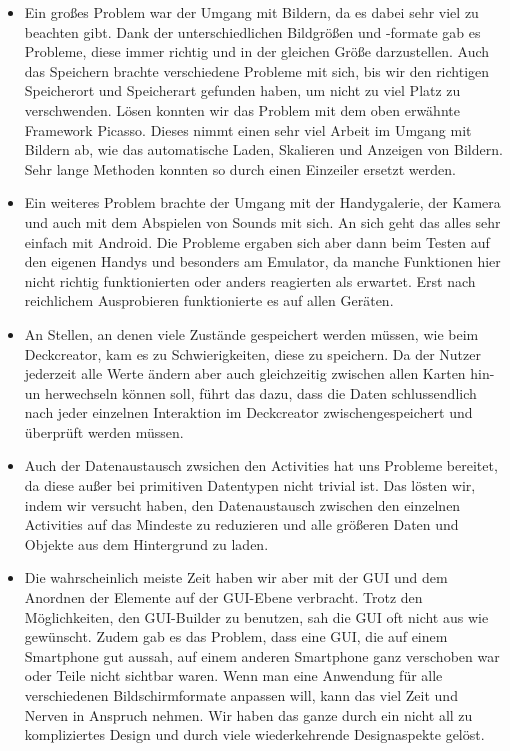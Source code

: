\begin{itemize} 
\item Ein großes Problem war der Umgang mit Bildern, da es dabei sehr viel zu beachten gibt. Dank der unterschiedlichen Bildgrößen und -formate gab es Probleme, diese immer richtig und in der gleichen Größe darzustellen. Auch das  Speichern brachte verschiedene Probleme mit sich, bis wir den richtigen Speicherort und Speicherart gefunden haben, um nicht zu viel Platz zu verschwenden. Lösen konnten wir das Problem mit dem oben erwähnte Framework Picasso. Dieses nimmt einen sehr viel Arbeit im Umgang mit Bildern ab, wie das automatische Laden, Skalieren und Anzeigen von Bildern. Sehr lange Methoden konnten so durch einen Einzeiler ersetzt werden.
\item Ein weiteres Problem brachte der Umgang mit der Handygalerie, der Kamera und auch mit dem Abspielen von Sounds mit sich. An sich geht das alles sehr einfach mit Android. Die Probleme ergaben sich aber dann beim Testen auf den eigenen Handys und besonders am Emulator, da manche Funktionen hier nicht richtig funktionierten oder anders reagierten als erwartet. Erst nach reichlichem Ausprobieren funktionierte es auf allen Geräten.
\item An Stellen, an denen viele Zustände gespeichert werden müssen, wie beim Deckcreator, kam es zu Schwierigkeiten, diese zu speichern. Da der Nutzer jederzeit alle Werte ändern aber auch gleichzeitig zwischen allen Karten hin- un  herwechseln können soll, führt das dazu, dass die Daten schlussendlich nach jeder einzelnen Interaktion im Deckcreator zwischengespeichert und überprüft werden müssen.
\item Auch der Datenaustausch zwsichen den Activities hat uns Probleme bereitet, da diese außer bei primitiven Datentypen nicht trivial ist. Das lösten wir, indem wir versucht haben, den Datenaustausch zwischen den einzelnen Activities auf das Mindeste zu reduzieren und alle größeren Daten und Objekte aus dem Hintergrund zu laden.
\item Die wahrscheinlich meiste Zeit haben wir aber mit der GUI und dem Anordnen der Elemente auf der GUI-Ebene verbracht. Trotz den Möglichkeiten, den GUI-Builder zu benutzen, sah die GUI oft nicht aus wie gewünscht. Zudem gab es das Problem, dass eine GUI, die auf einem Smartphone gut aussah, auf einem anderen Smartphone ganz verschoben war oder Teile nicht sichtbar waren. Wenn man eine Anwendung für alle verschiedenen Bildschirmformate anpassen will, kann das viel Zeit und Nerven in Anspruch nehmen. Wir haben das ganze durch ein nicht all zu kompliziertes Design und durch viele wiederkehrende Designaspekte gelöst.
\end{itemize}




